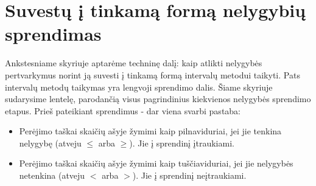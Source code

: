 \documentclass[a4paper,png]{article}
\begin{document}
\section{Suvestų į tinkamą formą nelygybių sprendimas}
Ankstesniame skyriuje aptarėme techninę dalį: kaip atlikti nelygybės pertvarkymus norint ją suvesti į tinkamą formą intervalų metodui taikyti. Pats intervalų metodų taikymas yra lengvoji sprendimo dalis. Šiame skyriuje sudarysime lentelę, parodančią visus pagrindinius kiekvienos nelygybės sprendimo etapus. Prieš pateikiant sprendimus - dar viena svarbi pastaba:
\begin{mdframed}[backgroundcolor=yellow!50!white]
\begin{itemize}
\item Perėjimo taškai skaičių ašyje žymimi kaip pilnaviduriai, jei jie tenkina nelygybę (atveju $\le$ arba $\ge$). Jie į sprendinį įtraukiami.
\item Perėjimo taškai skaičių ašyje žymimi kaip tuščiaviduriai, jei jie nelygybės netenkina (atveju $<$ arba $>$). Jie į sprendinį neįtraukiami.
\end{itemize}
\end{mdframed}
\noindent
\end{document}
